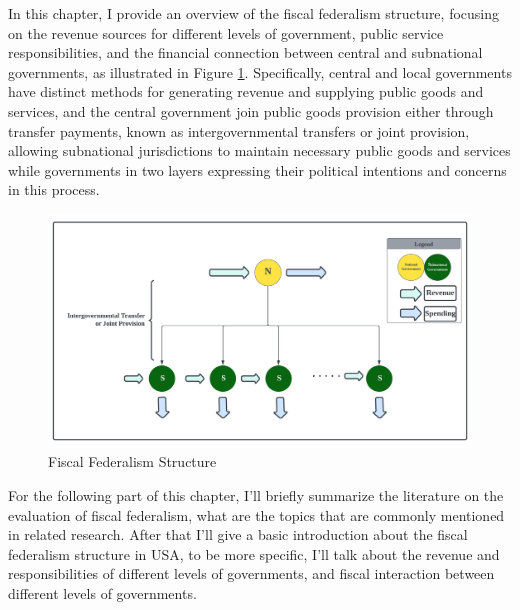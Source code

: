 In this chapter, I provide an overview of the fiscal federalism structure, focusing on the revenue sources for different levels of government, public service responsibilities, and the financial connection between central and subnational governments, as illustrated in Figure \ref*{Figure 1.1}. Specifically, central and local governments have distinct methods for generating revenue and supplying public goods and services, and the central government join public goods provision either through transfer payments, known as intergovernmental transfers or joint provision, allowing subnational jurisdictions to maintain necessary public goods and services while governments in two layers expressing their political intentions and concerns in this process.

\begin{figure}[H]
  \centering
  \includegraphics[scale=0.6]{Chapter-1/Figures/fiscal federalism.jpeg}
  \caption[Fiscal Federalism Structure]{Fiscal Federalism Structure
    \texttt{} }
  \label{Figure 1.1}
\end{figure}

For the following part of this chapter, I'll briefly summarize the literature on the evaluation of fiscal federalism, what are the topics that are commonly mentioned in related research.  After that I'll give a basic introduction about the fiscal federalism structure in USA, to be more specific, I'll talk about the revenue and responsibilities of different levels of governments, and fiscal interaction between different levels of governments.

